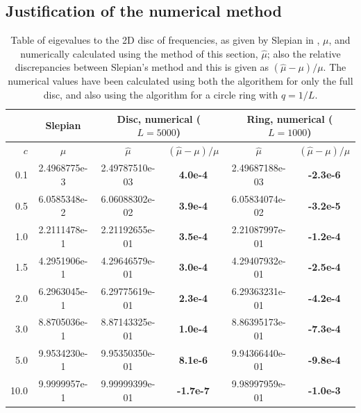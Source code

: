 \documentclass[11pt,a4paper, 
swedish,english %
]{article}
\begin{document}


\subsection{Justification of the numerical method}

\begin{table}

\centering
\caption{Table of eigevalues to the 2D disc of frequencies, as given
  by Slepian in \cite{PSWF-IV_1964}, $\mu$, and numerically
  calculated using the method of this section, $\hat\mu$; also the
  relative discrepancies between Slepian's method and this is given as
  $(\hat\mu-\mu)/\mu$. The numerical values have been
  calculated using both the algorithem for only the full disc, and
  also using the algorithm for a circle ring with $q=1/L$.
}
\label{tab:just}
\begin{tabular}{|r|c|c|c|c|c|}\cline{2-6}
\multicolumn{1}{c|}{}
&Slepian\cite{PSWF-IV_1964}&
\multicolumn{2}{|c|}{Disc, numerical ($L=5000$)}&
\multicolumn{2}{|c|}{Ring, numerical ($L=1000$)}
\\ \hline
$c$\phantom{1.}&$\mu$
&$\hat\mu$&$(\hat\mu-\mu)/\mu$
&$\hat\mu$&$(\hat\mu-\mu)/\mu$
\\ \hline
  0.1 & 2.4968775e-3 & 
2.49787510e-03 &\bf\phantom{-}4.0e-4&  
2.49687188e-03 &\bf-2.3e-6
\\ \hline
  0.5 & 6.0585348e-2 & 
6.06088302e-02 &\bf\phantom{-}3.9e-4&  
6.05834074e-02 &\bf-3.2e-5
\\ \hline
  1.0 & 2.2111478e-1 & 
2.21192655e-01 &\bf\phantom{-}3.5e-4&  
2.21087997e-01 &\bf-1.2e-4
\\ \hline
  1.5 & 4.2951906e-1 & 
4.29646579e-01 &\bf\phantom{-}3.0e-4&  
4.29407932e-01 &\bf-2.5e-4
\\ \hline
  2.0 & 6.2963045e-1 & 
6.29775619e-01 &\bf\phantom{-}2.3e-4&  
6.29363231e-01 &\bf-4.2e-4
\\ \hline
  3.0 & 8.8705036e-1 & 
8.87143325e-01 &\bf\phantom{-}1.0e-4&  
8.86395173e-01 &\bf-7.3e-4
\\ \hline
  5.0 & 9.9534230e-1 & 
9.95350350e-01 &\bf\phantom{-}8.1e-6&  
9.94366440e-01 &\bf-9.8e-4
\\ \hline
 10.0 & 9.9999957e-1 & 
9.99999399e-01 &\bf\phantom{}-1.7e-7&  
9.98997959e-01 &\bf-1.0e-3
\\ \hline
\end{tabular}
\end{table}


\end{document}
